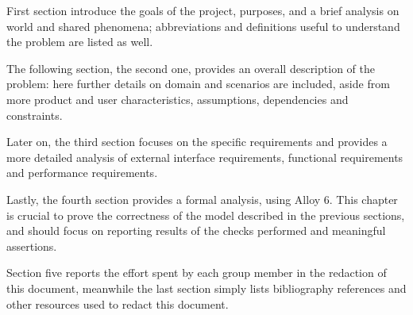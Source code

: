 First section introduce the goals of the project, purposes, and a brief analysis on world and shared phenomena;
abbreviations and definitions useful to understand the problem are listed as well.

The following section, the second one, provides an overall description of the problem: here further
details on domain and scenarios are included, aside from more product and user characteristics, assumptions,
dependencies and constraints.

Later on, the third section focuses on the specific requirements and provides a more detailed analysis of external
interface requirements, functional requirements and performance requirements.

Lastly, the fourth section provides a formal analysis, using Alloy 6.
This chapter is crucial to prove the correctness of the model described in the previous sections, and should focus on
reporting results of the checks performed and meaningful assertions.

Section five reports the effort spent by each group member in the redaction of this document, meanwhile the last
section simply lists bibliography references and other resources used to redact this document.
